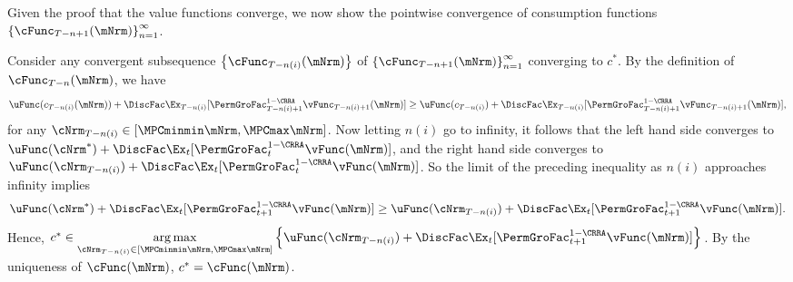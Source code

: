 \documentclass[\econtexRoot/BufferStockTheory]{subfiles}
\begin{document}
Given the proof that the value functions converge, we now show the
pointwise convergence of consumption functions
$\left\{\cFunc_{T-n+1}(\mNrm)\right\} _{n=1}^{\infty }$.

Consider any convergent subsequence $\left\{\cFunc_{T-n(i)}(\mNrm)\right\}$ of $\left\{\cFunc_{T-n+1}(\mNrm)\right\} _{n=1}^{\infty }$ converging to $c^*$. By the definition of $\cFunc_{T-n}(\mNrm)$, we have 
\begin{equation}
    \uFunc(c_{T - n(i)}(\mNrm)) + \DiscFac \Ex_{T - n(i)}[{\PermGroFac}_{T-n(i)+1}^{1 - \CRRA}\vFunc_{T-n(i)+1}(\mNrm)] \geq \uFunc(c_{T - n(i)}) + \DiscFac \Ex_{T - n(i)}[{\PermGroFac}_{T-n(i)+1}^{1 - \CRRA}\vFunc_{T-n(i)+1}(\mNrm)],
\end{equation}
for any $\cNrm_{T - n(i)} \in [\MPCminmin \mNrm,\MPCmax \mNrm]$. Now letting $n(i)$ go to infinity, it follows that the left hand side converges to $\uFunc(\cNrm^*) + \DiscFac \Ex_{t}[{\PermGroFac}_{t}^{1 - \CRRA}\vFunc(\mNrm)]$, and the right hand side converges to $\uFunc(\cNrm_{T - n(i)}) + \DiscFac \Ex_{t}[{\PermGroFac}_{t}^{1 - \CRRA}\vFunc(\mNrm)]$. So the limit of the preceding inequality as $n(i)$ approaches infinity implies 
\begin{equation}
   \uFunc(\cNrm^*) + \DiscFac \Ex_{t}[{\PermGroFac}_{t + 1}^{1 - \CRRA}\vFunc(\mNrm)] \geq \uFunc(\cNrm_{T - n(i)}) + \DiscFac \Ex_{t}[{\PermGroFac}_{t + 1}^{1 - \CRRA}\vFunc(\mNrm)].
\end{equation}
Hence, $c^* \in \underset{\cNrm_{T - n(i)} \in [\MPCminmin \mNrm,\MPCmax \mNrm]}{\arg \max }\left\{ \uFunc(\cNrm_{T - n(i)}) + \DiscFac \Ex_{t}[{\PermGroFac}_{t + 1}^{1 - \CRRA}\vFunc(\mNrm)]\right\}$. By the uniqueness of $\cFunc(\mNrm)$, $c^* = \cFunc(\mNrm)$.
\end{document}
